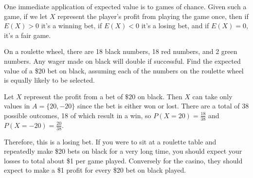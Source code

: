 \par
\noindent One immediate application of expected value is to games of chance. Given such a game, if we let $X$ represent the player's profit from playing the game once, then if $E(X) > 0$ it's a winning bet, if $E(X) < 0$ it's a losing bet, and if $E(X) = 0$, it's a fair game. 

\begin{examp}
On a roulette wheel, there are 18 black numbers, 18 red numbers, and 2 green numbers. Any wager made on black will double if successful. Find the expected value of a \$20 bet on black, assuming each of the numbers on the roulette wheel is equally likely to be selected.
\par
\noindent Let $X$ represent the profit from a bet of $\$20$ on black. Then $X$ can take only values in $A = \{20, -20\}$ since the bet is either won or lost. There are a total of 38 possible outcomes, 18 of which result in a win, so $P(X = 20) = \frac{18}{38}$ and $P(X = -20) = \frac{20}{38}$.
\par
\noindent Therefore, this is a losing bet. If you were to sit at a roulette table and repeatedly make \$20 bets on black for a very long time, you should expect your losses to total about \$1 per game played. Conversely for the casino, they should expect to make a \$1 profit for every \$20 bet on black played.
\end{examp}

